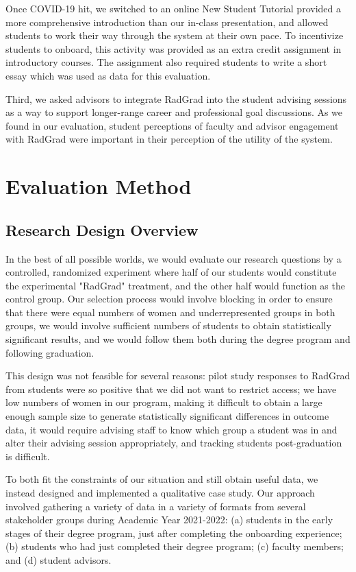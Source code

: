 \documentclass[acmsmall]{acmart}
\begin{document}
Once COVID-19 hit, we switched to an online New Student Tutorial \cite{johnson_radgrad_2022} provided a more comprehensive introduction than our in-class presentation, and allowed students to work their way through the system at their own pace.  To incentivize students to onboard, this activity was provided as an extra credit assignment in introductory courses.  The assignment also required students to write a short essay which was used as data for this evaluation.

Third, we asked advisors to integrate RadGrad into the student advising sessions as a way to support longer-range career and professional goal discussions.  As we found in our evaluation, student perceptions of faculty and advisor engagement with RadGrad were important in their perception of the utility of the system.

\section{Evaluation Method}
\label{sec:method}

\subsection{Research Design Overview}

In the best of all possible worlds, we would evaluate our research questions by a controlled, randomized experiment where half of our students would constitute the experimental "RadGrad" treatment, and the other half would function as the control group.  Our selection process would involve blocking in order to ensure that there were equal numbers of women and underrepresented groups in both groups, we would involve sufficient numbers of students to obtain statistically significant results, and we would follow them both during the degree program and following graduation.

This design was not feasible for several reasons: pilot study responses to RadGrad from students were so positive that we did not want to restrict access; we have low numbers of women in our program, making it difficult to obtain a large enough sample size to generate statistically significant differences in outcome data, it would require advising staff to know which group a student was in and alter their advising session appropriately, and tracking students post-graduation is difficult.

To both fit the constraints of our situation and still obtain useful data, we instead designed and implemented a qualitative case study. Our approach involved gathering a variety of data in a variety of formats from several stakeholder groups during Academic Year 2021-2022: (a) students in the early stages of their degree program, just after completing the onboarding experience; (b) students who had just completed their degree program; (c) faculty members; and (d) student advisors.
\end{document}
